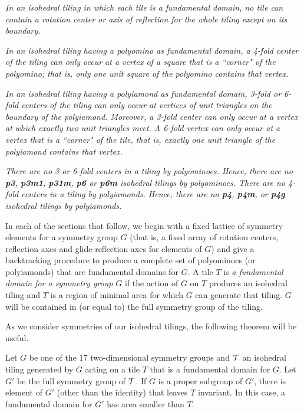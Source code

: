 \documentclass{ws-ijcga}
\begin{document}
\begin{romanlist}
\item 
{\it In an isohedral tiling in which each tile is a fundamental domain, no tile can contain a
rotation center or axis of reflection for the whole tiling except on its boundary.}
\item 
{\it In an isohedral tiling having a polyomino as fundamental domain, a 4-fold center of the tiling
can only occur at a vertex of a square that is a ``corner" of the polyomino; 
that is, only one unit square of the polyomino contains that vertex.}
\item
{\it In an isohedral tiling having a polyiamond as fundamental domain, 3-fold or 6-fold centers of
the tiling can only occur at vertices of unit triangles on the boundary of the polyiamond.
Moreover, a 3-fold center can only occur at a vertex at which exactly two unit triangles meet. A
6-fold vertex can only occur at a vertex that is a ``corner" of the tile, that is, exactly one unit
triangle of the polyiamond contains that vertex.}
\item
{\it There are no 3-or 6-fold centers in a tiling by polyominoes. 
Hence, there are no \mbox{\bf p3}, \mbox{\bf p3m1},
\mbox{\bf p31m}, \mbox{\bf p6} or \mbox{\bf p6m} isohedral tilings by polyominoes. 
There are no 4-fold centers in a tiling by
polyiamonds. Hence, there are no \mbox{\bf p4}, \mbox{\bf p4m}, or \mbox{\bf p4g} isohedral tilings by polyiamonds. }
\end{romanlist}

In each of the sections that follow, we begin with a fixed lattice of symmetry elements for a
symmetry group $G$ (that is, a fixed array of rotation centers, reflection axes and glide-reflection
axes for elements of $G$) and give a backtracking procedure to produce a complete set of
polyominoes (or polyiamonds) that are fundamental domains for $G$. 
A tile $T$ is {\it a fundamental domain for a symmetry group $G$} 
if the action of $G$ on $T$ produces an isohedral tiling and $T$ is a
region of minimal area for which $G$ can generate that tiling. $G$ will be contained in (or equal to)
the full symmetry group of the tiling.

As we consider symmetries of our isohedral tilings, the following theorem will be useful. \cite{fukuda2011}

\begin{theorem}
\label{th1}
Let $G$ be one of the 17 two-dimensional symmetry groups and ${\cal T}$ an isohedral tiling
generated by $G$ acting on a tile $T$ that is a fundamental domain for $G$. 
Let $G'$ be the full
symmetry group of ${\cal T}$. 
If $G$ is a proper subgroup of $G'$, there is element of $G'$ (other than the
identity) that leaves $T$ invariant. In this case, a fundamental domain for $G'$ has area smaller
than $T$.
\end{theorem}
\end{document}
